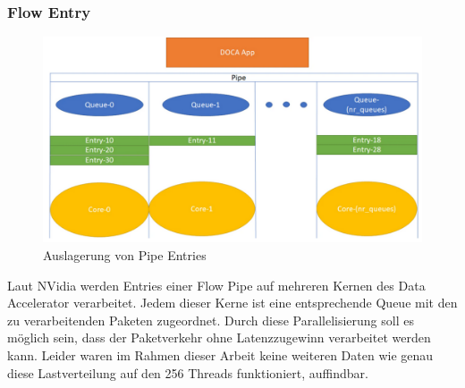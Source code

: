 \subsubsection{Flow Entry}
\begin{figure}
    \centering
    \includegraphics[width=1\linewidth]{images/entries.png}
    \caption{Auslagerung von Pipe Entries}
    \label{fig:enter-label}
\end{figure}
Laut NVidia werden Entries einer Flow Pipe auf mehreren Kernen des Data Accelerator verarbeitet. Jedem dieser Kerne ist eine entsprechende Queue mit den zu verarbeitenden Paketen zugeordnet. Durch diese Parallelisierung soll es möglich sein, dass der Paketverkehr ohne Latenzzugewinn verarbeitet werden kann. Leider waren im Rahmen dieser Arbeit keine weiteren Daten wie genau diese Lastverteilung auf den 256 Threads funktioniert, auffindbar.
